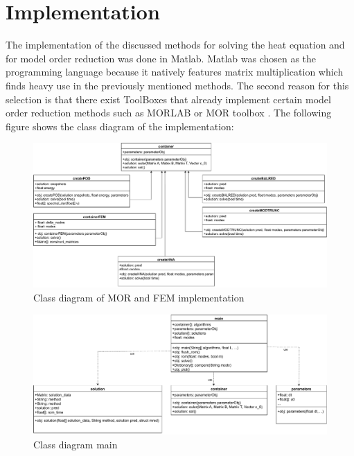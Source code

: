 \chapter{Implementation}
The implementation of the discussed methods for solving the heat equation and for model order reduction was done in Matlab.
Matlab was chosen as the programming language because it natively features matrix multiplication which finds heavy use in the previously mentioned methods.
The second reason for this selection is that there exist ToolBoxes that already implement certain model order reduction methods such as MORLAB \cite{benner_werner} or MOR toolbox \cite{MORT}.
The following figure shows the class diagram of the implementation:

\begin{figure}[H]
\includegraphics[width=\textwidth]{images/container}
\caption{Class diagram of MOR and FEM implementation}
\end{figure}

\begin{figure}[H]
\includegraphics[width=\textwidth]{images/main}
\caption{Class diagram main}
\end{figure}

